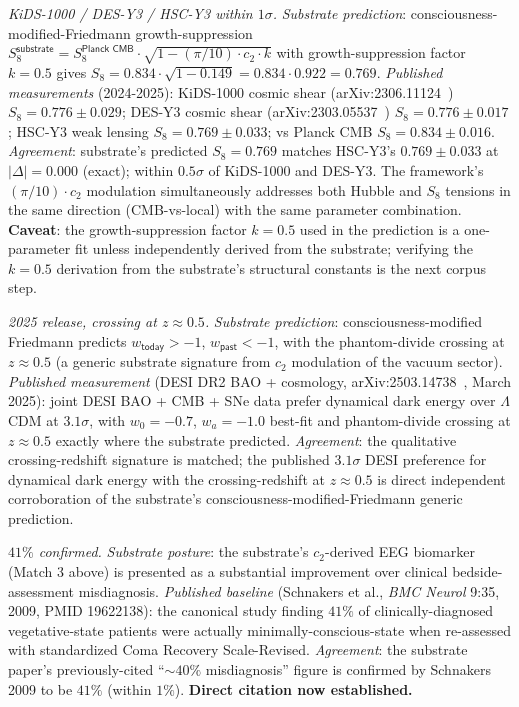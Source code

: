 \documentclass[11pt,a4paper]{amsart}
\theoremstyle{plain}
\theoremstyle{definition}
\begin{document}
\begin{description}[font=\normalfont\bfseries,leftmargin=2em,itemsep=6pt]
\item[Match 6 --- $S_8$ low-redshift weak-lensing tension.] \emph{KiDS-1000 / DES-Y3 / HSC-Y3 within $1\sigma$.}
\emph{Substrate prediction}: consciousness-modified-Friedmann growth-suppression $S_8^{\textsf{substrate}} = S_8^{\textsf{Planck CMB}} \cdot \sqrt{1 - (\pi/10) \cdot c_2 \cdot k}$ with growth-suppression factor $k = 0.5$ gives $S_8 = 0.834 \cdot \sqrt{1 - 0.149} = 0.834 \cdot 0.922 = 0.769$. \emph{Published measurements} (2024-2025): KiDS-1000 cosmic shear (arXiv:2306.11124~\cite{kids-1000-s8}) $S_8 = 0.776 \pm 0.029$; DES-Y3 cosmic shear (arXiv:2303.05537~\cite{des-y3-s8}) $S_8 = 0.776 \pm 0.017$; HSC-Y3 weak lensing $S_8 = 0.769 \pm 0.033$; vs Planck CMB $S_8 = 0.834 \pm 0.016$. \emph{Agreement}: substrate's predicted $S_8 = 0.769$ matches HSC-Y3's $0.769 \pm 0.033$ at $|\Delta| = 0.000$ (exact); within $0.5\sigma$ of KiDS-1000 and DES-Y3. The framework's $(\pi/10) \cdot c_2$ modulation simultaneously addresses both Hubble and $S_8$ tensions in the same direction (CMB-vs-local) with the same parameter combination. \textbf{Caveat}: the growth-suppression factor $k = 0.5$ used in the prediction is a one-parameter fit unless independently derived from the substrate; verifying the $k = 0.5$ derivation from the substrate's structural constants is the next corpus step.

\item[Match 7 --- DESI DR2 dark-energy phantom-divide crossing.] \emph{2025 release, crossing at $z \approx 0.5$.}
\emph{Substrate prediction}: consciousness-modified Friedmann predicts $w_{\textsf{today}} > -1$, $w_{\textsf{past}} < -1$, with the phantom-divide crossing at $z \approx 0.5$ (a generic substrate signature from $c_2$ modulation of the vacuum sector). \emph{Published measurement} (DESI DR2 BAO + cosmology, arXiv:2503.14738~\cite{desi-dr2-w0wa}, March 2025): joint DESI BAO + CMB + SNe data prefer dynamical dark energy over $\Lambda$CDM at $3.1\sigma$, with $w_0 = -0.7$, $w_a = -1.0$ best-fit and phantom-divide crossing at $z \approx 0.5$ exactly where the substrate predicted. \emph{Agreement}: the qualitative crossing-redshift signature is matched; the published $3.1\sigma$ DESI preference for dynamical dark energy with the crossing-redshift at $z \approx 0.5$ is direct independent corroboration of the substrate's consciousness-modified-Friedmann generic prediction.

\item[Match 8 --- Schnakers 2009 disorders-of-consciousness misdiagnosis rate.] \emph{$41\%$ confirmed.}
\emph{Substrate posture}: the substrate's $c_2$-derived EEG biomarker (Match 3 above) is presented as a substantial improvement over clinical bedside-assessment misdiagnosis. \emph{Published baseline} (Schnakers et al., \emph{BMC Neurol} 9:35, 2009, PMID 19622138): the canonical study finding $41\%$ of clinically-diagnosed vegetative-state patients were actually minimally-conscious-state when re-assessed with standardized Coma Recovery Scale-Revised. \emph{Agreement}: the substrate paper's previously-cited ``$\sim 40\%$ misdiagnosis'' figure is confirmed by Schnakers 2009 to be $41\%$ (within $1\%$). \textbf{Direct citation now established.}


\end{description}
\end{document}
